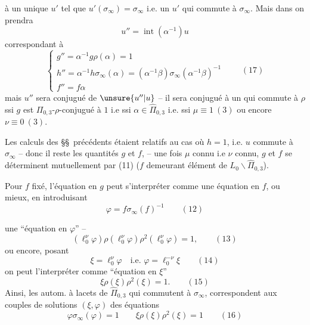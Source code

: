 

à un unique $u'$ tel que $u'(\sigma_\infty)=\sigma_\infty$ i.e. un $u'$ qui commute à $\sigma_\infty$. Mais dans  on prendra
\[
u''=\operatorname{int}(\alpha^{-1})u
\]
correspondant à
\[
\left\{\begin{array}{l}
g''=\alpha^{-1}g\rho(\alpha)=1\\
h''=\alpha^{-1}h\sigma_\infty(\alpha)=(\alpha^{-1}\beta)\sigma_\infty(\alpha^{-1}\beta)^{-1}\\
f''=f\alpha
\end{array}\right.
\qquad (17)
\]
mais $u''$ sera conjugué  de $\unsure{u''|u}$ -- il sera conjugué à un   qui commute à $\rho$ ssi $g$ est $\Pi_{0,3}$-$\rho$-conjugué à $1$ i.e ssi $\alpha\in\widehat{\Pi}_{0,3}$ i.e. ssi $\mu\equiv1\ (3)$ ou encore $\nu\equiv0\ (3)$.

 Les calculs des \S\S\ précédents étaient relatifs au cas où $h=1$, i.e. $u$ commute à $\sigma_\infty$ -- donc  il reste les quantités $g$ et $f$,  
-- une fois $\mu$ connu i.e $\nu$ connu, $g$ et $f$ se déterminent mutuellement par (11) ($f$ demeurant élément de $L_0\backslash\widehat{\Pi}_{0,3}$).


Pour $f$ fixé, l'équation en $g$ peut s'interpréter comme une équation en $f$, ou mieux, en introduisant
\[
\varphi=f\sigma_\infty(f)^{-1}
\qquad (12)
\]



une ``équation en $\varphi$'' --
\[
(\ell_0^\nu\varphi)\rho(\ell_0^\nu\varphi)\rho^2(\ell_0^\nu\varphi)=1,
\qquad (13)
\]
ou encore, posant
\[
\boxed{\xi=\ell_0^\nu\varphi\quad\text{i.e. }\varphi=\ell_0^{-\nu}\xi}
\qquad (14)
\]
on peut l'interpréter comme ``équation en $\xi$''
\[
\xi\rho(\xi)\rho^2(\xi)=1.
\qquad (15)
\]
Ainsi, les autom. à lacets de $\widehat{\Pi}_{0,3}$ qui commutent à $\sigma_\infty$,  correspondent aux couples de solutions $(\xi,\varphi)$ des équations
\[
\boxed{\varphi\sigma_\infty(\varphi)=1\qquad
\xi\rho(\xi)\rho^2(\xi)=1}
\qquad (16)
\]

